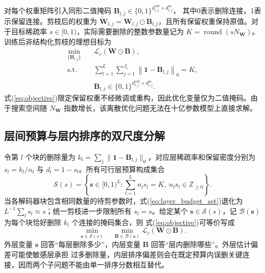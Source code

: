 \documentclass[UTF8,fontset=fandol]{ctexart}
\begin{document}
对每个权重矩阵引入同形二值掩码
$\bm B_{l,j}\in\{0,1\}^{d_{l,j}^{\mathrm{out}}\times d_{l,j}^{\mathrm{in}}}$，
其中0表示删除连接，1表示保留连接。剪枝后的权重为
$\widetilde{\bm W}_{l,j}=\bm W_{l,j}\odot\bm B_{l,j}$，且所有保留权重保持原值。对于目标稀疏率
$s\in[0,1)$，实际需要删除的整数参数量记为
$K=\operatorname{round}(sN_{\bm W})$。训练后非结构化剪枝的理想目标为
\begin{equation}
\begin{aligned}
\min_{\{\bm B_{l,j}\}}\quad&
\mathcal L_c(\bm W\odot\bm B),\\
\mathrm{s.t.}\quad&
\sum_{l=1}^{L}\sum_{j=1}^{J_l}
\left\|\bm 1-\bm B_{l,j}\right\|_0=K,\\
&\bm B_{l,j}\in\{0,1\}^{d_{l,j}^{\mathrm{out}}\times d_{l,j}^{\mathrm{in}}}.
\end{aligned}
\label{eq:objective}
\end{equation}
式(\ref{eq:objective})限定保留权重不经微调或重构，因此优化变量仅为二值掩码。由于搜索空间随
$N_{\bm W}$ 指数增长，该离散优化问题无法在十亿参数模型上直接求解。

\subsection{层间预算与层内排序的双尺度分解}

令第 $l$ 个块的删除量为
$k_l=\sum_j\|\bm 1-\bm B_{l,j}\|_0$，对应层稀疏率和保留密度分别为
$s_l=k_l/n_l$ 与 $d_l=1-s_l$。所有可行层预算构成集合
\begin{equation}
\mathcal S(s)=
\left\{
\bm s\in[0,1)^L:
\sum_{l=1}^{L}n_ls_l=K,\ 
n_ls_l\in\mathbb Z_{\geq 0}
\right\}.
\label{eq:layer_budget_set}
\end{equation}
当各解码器块包含相同数量的待剪参数时，式(\ref{eq:layer_budget_set})退化为
$L^{-1}\sum_l s_l\approx s$；统一剪枝进一步限制所有 $s_l=s$。给定某个
$\bm s\in\mathcal S(s)$，记 $\mathcal B(\bm s)$ 为每个块恰好删除 $k_l$ 个连接的掩码集合，则
式(\ref{eq:objective})可等价写成
\begin{equation}
\min_{\bm s\in\mathcal S(s)}
\quad
\min_{\bm B\in\mathcal B(\bm s)}
\mathcal L_c(\bm W\odot\bm B).
\label{eq:nested_objective}
\end{equation}
外层变量 $\bm s$ 回答“每层删除多少”，内层变量 $\bm B$ 回答“层内删除哪些”。外层估计偏差可能使敏感层承担
过多删除量，内层排序偏差则会在既定预算内误删关键连接，因而两个子问题不能由单一排序分数相互替代。
\end{document}
